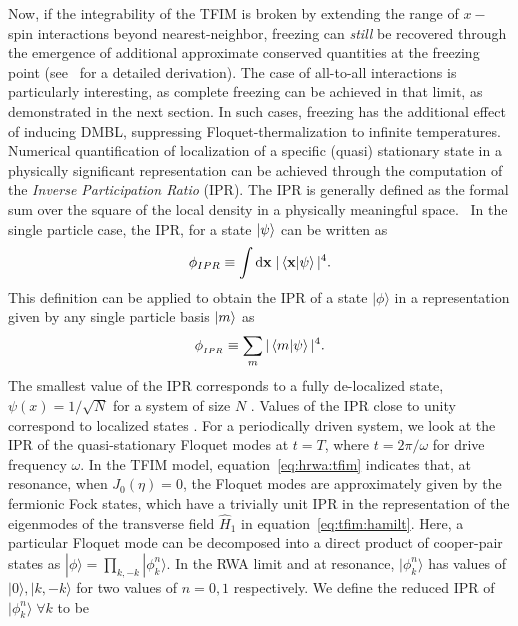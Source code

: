 \documentclass[%
reprint,
superscriptaddress,
amsmath,amssymb,
aps,
prb,
showkeys,
]{revtex4-2}
\begin{document}
	Now, if the integrability of the TFIM is broken by extending the range of $x-$spin interactions beyond nearest-neighbor, freezing can \textit{still} be recovered through the emergence of additional approximate conserved quantities at the freezing point (see~\cite{rahaman2024time} for a detailed derivation). The case of all-to-all interactions is particularly interesting, as complete freezing can be achieved in that limit, as demonstrated in the next section. In such cases, freezing has the additional effect of inducing DMBL, suppressing Floquet-thermalization to infinite temperatures. Numerical quantification of localization of a specific (quasi) stationary state in a physically significant representation can be achieved through the computation of the \emph{Inverse Participation Ratio} (IPR).  {The IPR is generally defined as the formal sum over the square of the local density in a physically meaningful space.}~\cite{mukherjee_modulation-assisted_2015,lin_many-body_2018,murphy_generalized_2011, torres-herrera_self-averaging_2020} {In the single particle case,  the IPR, } for a state $\ket{\psi}$ can be written as
	\begin{equation*}
		\phi_{IPR}\equiv \int \mathrm{d}\mathbf{x}\;\vert\ip{\mathbf{x}}{\psi}\vert^4.
	\end{equation*}
	This definition can be {applied} to {obtain} the IPR of a state $|\phi\rangle$ in a representation given by {any single particle} basis $\ket{m}$ as 
	\begin{equation}
		\label{eq:ipr:defn}
		\phi_{{_{IPR}}} \equiv \sum_m\vert\ip{m}{\psi}\vert^4.
	\end{equation}
	The smallest value of the IPR corresponds to a fully de-localized state, $\psi(x)=1/\sqrt{N}$ for a system of size $N$ \cite{torres-herrera_self-averaging_2020,trivedi_can_2005}. Values of the IPR close to unity correspond to localized states \cite{Misguich2016}. For a periodically driven system, we look at the IPR of the quasi-stationary Floquet modes at $t=T$, where $t=2\pi/\omega$ for drive frequency $\omega$. In the TFIM model, equation~\ref{eq:hrwa:tfim} indicates that, at resonance, when $J_0(\eta)=0$, the Floquet modes are approximately given by the fermionic Fock states, which have a trivially unit IPR in the representation of the eigenmodes of the transverse field $\hat{H}_1$ in equation~\ref{eq:tfim:hamilt}. Here, a particular Floquet mode can be decomposed into a direct product of cooper-pair states as $|\phi\rangle = \prod_{k,-k}|\phi^n_k\rangle$. In the RWA limit and at resonance, $|\phi^n_k\rangle$ has values of $|0\rangle, |k,-k\rangle$ for two values of $n=0,1$ respectively. We define the reduced IPR of $|\phi^n_k\rangle\; \forall k$ to be
\end{document}
